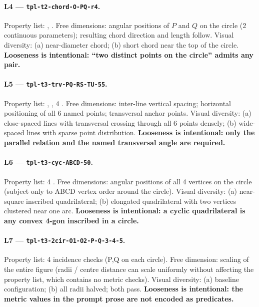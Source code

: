 \paragraph{L4 --- \texttt{tpl-t2-chord-O-PQ-r4}.}
Property list: , .
Free dimensions: angular positions of $P$ and $Q$ on the circle (2 continuous parameters); resulting chord direction and length follow.
Visual diversity: (a) near-diameter chord; (b) short chord near the top of the circle.
\textbf{Looseness is intentional: ``two distinct points on the circle'' admits any pair.}

\paragraph{L5 --- \texttt{tpl-t3-trv-PQ-RS-TU-55}.}
Property list: , , 4 .
Free dimensions: inter-line vertical spacing; horizontal positioning of all 6 named points; transversal anchor points.
Visual diversity: (a) close-spaced lines with transversal crossing through all 6 points densely; (b) wide-spaced lines with sparse point distribution.
\textbf{Looseness is intentional: only the parallel relation and the named transversal angle are required.}

\paragraph{L6 --- \texttt{tpl-t3-cyc-ABCD-50}.}
Property list: 4 .
Free dimensions: angular positions of all 4 vertices on the circle (subject only to ABCD vertex order around the circle).
Visual diversity: (a) near-square inscribed quadrilateral; (b) elongated quadrilateral with two vertices clustered near one arc.
\textbf{Looseness is intentional: a cyclic quadrilateral is any convex 4-gon inscribed in a circle.}

\paragraph{L7 --- \texttt{tpl-t3-2cir-O1-O2-P-Q-3-4-5}.}
Property list: 4 incidence checks (P,Q on each circle).
Free dimension: scaling of the entire figure (radii / centre distance can scale uniformly without affecting the property list, which contains no metric checks).
Visual diversity: (a) baseline configuration; (b) all radii halved; both pass.
\textbf{Looseness is intentional: the metric values in the prompt prose are not encoded as predicates.}

